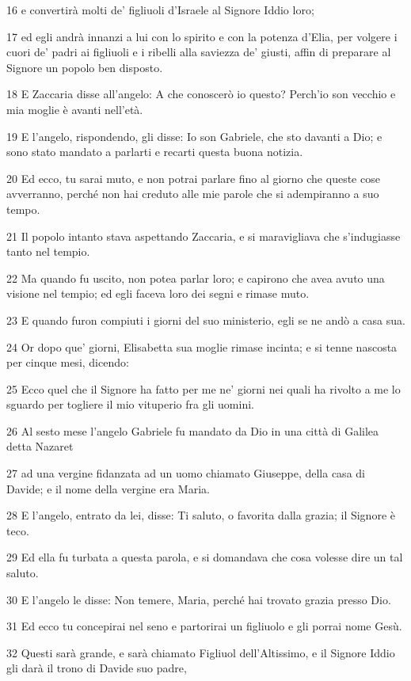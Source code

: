 \par 16 e convertirà molti de' figliuoli d'Israele al Signore Iddio loro;
\par 17 ed egli andrà innanzi a lui con lo spirito e con la potenza d'Elia, per volgere i cuori de' padri ai figliuoli e i ribelli alla saviezza de' giusti, affin di preparare al Signore un popolo ben disposto.
\par 18 E Zaccaria disse all'angelo: A che conoscerò io questo? Perch'io son vecchio e mia moglie è avanti nell'età.
\par 19 E l'angelo, rispondendo, gli disse: Io son Gabriele, che sto davanti a Dio; e sono stato mandato a parlarti e recarti questa buona notizia.
\par 20 Ed ecco, tu sarai muto, e non potrai parlare fino al giorno che queste cose avverranno, perché non hai creduto alle mie parole che si adempiranno a suo tempo.
\par 21 Il popolo intanto stava aspettando Zaccaria, e si maravigliava che s'indugiasse tanto nel tempio.
\par 22 Ma quando fu uscito, non potea parlar loro; e capirono che avea avuto una visione nel tempio; ed egli faceva loro dei segni e rimase muto.
\par 23 E quando furon compiuti i giorni del suo ministerio, egli se ne andò a casa sua.
\par 24 Or dopo que' giorni, Elisabetta sua moglie rimase incinta; e si tenne nascosta per cinque mesi, dicendo:
\par 25 Ecco quel che il Signore ha fatto per me ne' giorni nei quali ha rivolto a me lo sguardo per togliere il mio vituperio fra gli uomini.
\par 26 Al sesto mese l'angelo Gabriele fu mandato da Dio in una città di Galilea detta Nazaret
\par 27 ad una vergine fidanzata ad un uomo chiamato Giuseppe, della casa di Davide; e il nome della vergine era Maria.
\par 28 E l'angelo, entrato da lei, disse: Ti saluto, o favorita dalla grazia; il Signore è teco.
\par 29 Ed ella fu turbata a questa parola, e si domandava che cosa volesse dire un tal saluto.
\par 30 E l'angelo le disse: Non temere, Maria, perché hai trovato grazia presso Dio.
\par 31 Ed ecco tu concepirai nel seno e partorirai un figliuolo e gli porrai nome Gesù.
\par 32 Questi sarà grande, e sarà chiamato Figliuol dell'Altissimo, e il Signore Iddio gli darà il trono di Davide suo padre,
